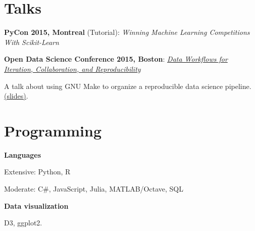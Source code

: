 \documentclass[letterpaper]{resume}
\begin{document}
\section{Talks}

\begin{compactitem}
\item \textbf{PyCon 2015, Montreal} (Tutorial): \textit{Winning Machine Learning Competitions With Scikit-Learn}
\item \textbf{Open Data Science Conference 2015, Boston}: \textit{\href{http://opendatascicon.com/schedule/data-workflows-for-iteration-collaboration-and-reproducibility/}{Data Workflows for Iteration, Collaboration, and Reproducibility}}
\begin{compactitem}
\item A talk about using GNU Make to organize a reproducible data science pipeline. \href{http://www.davidchudzicki.com/slides/odsc-2015-workflow/}{(slides)}.
\end{compactitem}
\end{compactitem}




\section{Programming}
\vspace{1pt}
\begin{compactitem}
\item \textbf{Languages} 
\begin{compactitem}
\item Extensive: Python, R
\item Moderate: C\#, JavaScript, Julia, MATLAB/Octave, SQL
\end{compactitem}
\item \textbf{Data visualization}
\begin{compactitem}
\item D3, ggplot2.
\end{compactitem}
\end{compactitem}
\end{document}
